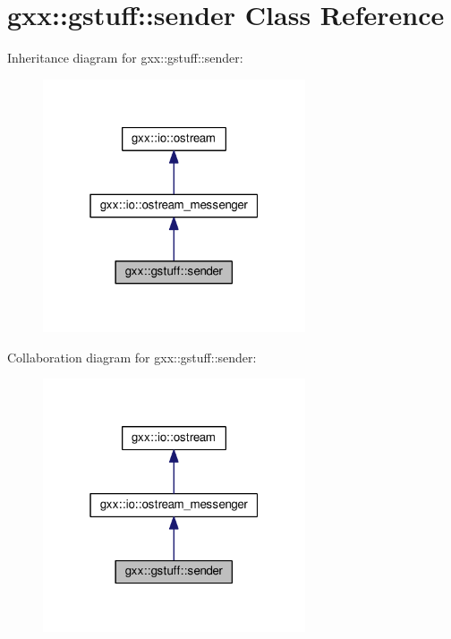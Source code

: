 \hypertarget{classgxx_1_1gstuff_1_1sender}{}\section{gxx\+:\+:gstuff\+:\+:sender Class Reference}
\label{classgxx_1_1gstuff_1_1sender}


Inheritance diagram for gxx\+:\+:gstuff\+:\+:sender\+:
\nopagebreak
\begin{figure}[H]
\begin{center}
\leavevmode
\includegraphics[width=220pt]{classgxx_1_1gstuff_1_1sender__inherit__graph}
\end{center}
\end{figure}


Collaboration diagram for gxx\+:\+:gstuff\+:\+:sender\+:
\nopagebreak
\begin{figure}[H]
\begin{center}
\leavevmode
\includegraphics[width=220pt]{classgxx_1_1gstuff_1_1sender__coll__graph}
\end{center}
\end{figure}
